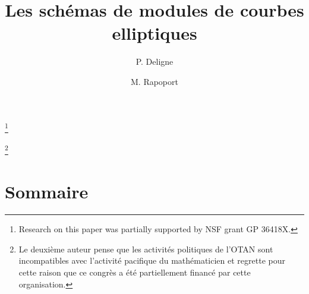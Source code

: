 \documentclass{amsart}
\theoremstyle{plain}
\theoremstyle{remark}
\begin{document}
\title{Les sch\'emas de modules de courbes elliptiques}
\author{P. Deligne}
\thanks{Research on this paper was partially supported by NSF grant GP 36418X.}
\author{M. Rapoport}
\thanks{Le deuxi\`eme auteur pense que les activit\'es politiques de l'OTAN sont incompatibles avec l'activit\'e pacifique du math\'ematicien et regrette pour cette raison que ce congr\`es a \'et\'e partiellement financ\'e par cette organisation.}
\maketitle

\section*{Sommaire}
\end{document}
